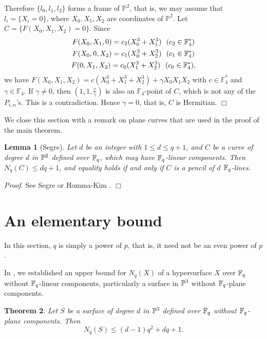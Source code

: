\documentclass[a4paper,11pt]{article}
\newtheorem{theorem}{Theorem}[section]
\newtheorem{lemma}[theorem]{Lemma}
\newcommand{\proof}{\noindent \mbox{\em Proof.\hspace*{2mm}}}
\newcommand{\qed}{\hfill \mbox{$  \Box $}}
\begin{document}
Therefore
$\{l_0, l_1, l_2\}$ forms a frame of $\mathbb{P}^2$,
that is, we may assume that
$l_i =\{ X_i=0 \}$, where $X_0, X_1, X_2$ are coordinates of $\mathbb{P}^2$.
Let $C=\{ F(X_0, X_1, X_2)=0\}$.
Since
\begin{gather}
 F(X_0, X_1, 0) = c_2(X_0^3 + X_1^3) \ \ 
            (c_2 \in \mathbb{F}_4^{\ast}) \notag \\
 F(X_0, 0, X_2) = c_1(X_0^3 + X_2^3) \ \ 
            (c_1 \in \mathbb{F}_4^{\ast}) \notag \\
 F(0, X_1, X_2) = c_0(X_1^3 + X_2^3) \ \ 
            (c_0 \in \mathbb{F}_4^{\ast}), \notag 
\end{gather}
we have
 $F(X_0, X_1, X_2) = c(X_0^3 + X_1^3+X_2^3) + \gamma X_0 X_1 X_2$
with $c \in \mathbb{F}_4^{\ast}$ and $\gamma \in \mathbb{F}_4$.
If $\gamma\neq 0$, then $(1,1,\frac{c}{\gamma})$
is also an $\mathbb{F}_4$-point of $C$,
which is not any of the $P_{i, \alpha}$'s.
This is a contradiction.
Hence $\gamma =0$, that is, $C$ is Hermitian.
\qed



We close this section with a remark on plane curves
that are used in the proof of the main theorem.

\begin{lemma}[Segre]\label{segre_bound}
Let $d$ be an integer with $1 \leq d \leq q+1$,
and $C$ be a curve of degree $d$ in ${\Bbb P}^2$
defined over ${\Bbb F}_q$,
which may have ${\Bbb F}_q$-linear components.
Then $N_q(C) \leq dq+1$,
and equality holds if and only if $C$ is a pencil of
$d$ ${\Bbb F}_q$-lines.
\end{lemma}
\proof
See Segre \cite[II, \S 6 Observation IV ]{seg1959}
or Homma-Kim \cite[Remark 1.2]{hom-kim2009}.
\qed


\section{An elementary bound}
In this section, $q$ is simply a power of $p$, that is,
it need not be an even power of $p$.

In \cite{hom-kim2013},
we established an upper bound for $N_q(X)$ of a hypersurface $X$
over ${\Bbb F}_q$ without ${\Bbb F}_q$-linear components,
particularly a surface in ${\Bbb P}^3$ without
${\Bbb F}_q$-plane components.

\begin{theorem}
Let $S$ be a surface of degree $d$ in ${\Bbb P}^3$
defined over ${\Bbb F}_q$
without ${\Bbb F}_q$-plane components.
Then
\begin{equation}\label{elementary_bound}
N_q(S) \leq (d-1)q^2 + dq +1.
\end{equation}
\end{theorem}
\end{document}

